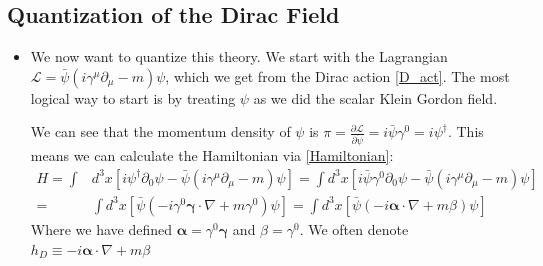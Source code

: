\documentclass[11pt]{article}
\numberwithin{equation}{section}
\begin{document}
  \subsection{Quantization of the Dirac Field}
  \begin{itemize}
      \item We now want to quantize this theory. We start with the Lagrangian $\mathcal{L} = \bar{\psi}(i\gamma^{\mu}\partial_{\mu}-m)\psi$, which we get from the Dirac action \ref{D_act}. The most logical way to start is by treating $\psi$ as we did the scalar Klein Gordon field.

       We can see that the momentum density of $\psi$ is $\pi = \frac{\partial \mathcal{L}}{\partial \dot{\psi}} =i \bar{\psi}\gamma^{0} = i\psi^{\dagger} $. This means we can calculate the Hamiltonian via \ref{Hamiltonian}:
    \begin{align}
    \label{D_ham}
    H = \int &d^3x\left[i\psi^{\dagger}\partial_{0}\psi -\bar{\psi}(i\gamma^{\mu}\partial_{\mu}-m)\psi \right]  = \int d^3x\left[i\bar{\psi}\gamma^{0}\partial_{0}\psi -\bar{\psi}(i\gamma^{\mu}\partial_{\mu}-m)\psi \right] \nonumber \\
     = &\int d^3x\left[\bar{\psi}(-i\gamma^{0}\boldsymbol{\gamma}\cdot \nabla +m\gamma^{0})\psi \right]   =  \int d^3x\left[\bar{\psi}(-i\boldsymbol{\alpha}\cdot \nabla +m\beta)\psi \right]   
    \end{align}
    Where we have defined $\boldsymbol{\alpha} =\gamma^{0}\boldsymbol{\gamma}$ and $\beta = \gamma^{0}$. We often denote $h_D \equiv -i\boldsymbol{\alpha}\cdot \nabla +m\beta$
  \end{itemize}    
\end{document}

